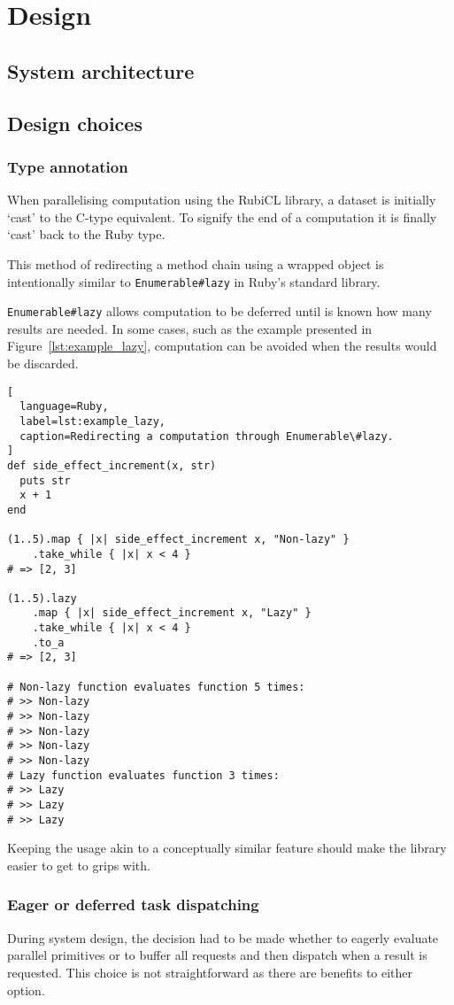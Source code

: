 \chapter{Design}

\section{System architecture}


\section{Design choices}
\subsection{Type annotation}
When parallelising computation using the RubiCL library, a dataset is initially `cast' to the C-type equivalent. To signify the end of a computation it is finally `cast' back to the Ruby type.

This method of redirecting a method chain using a wrapped object is intentionally similar to \verb|Enumerable#lazy| in Ruby's standard library.

\verb|Enumerable#lazy| allows computation to be deferred until is known how many results are needed. In some cases, such as the example presented in Figure~\ref{lst:example_lazy}, computation can be avoided when the results would be discarded.

\begin{lstlisting}[
  language=Ruby,
  label=lst:example_lazy,
  caption=Redirecting a computation through Enumerable\#lazy.
]
def side_effect_increment(x, str)
  puts str
  x + 1
end

(1..5).map { |x| side_effect_increment x, "Non-lazy" }
    .take_while { |x| x < 4 }
# => [2, 3]

(1..5).lazy
    .map { |x| side_effect_increment x, "Lazy" }
    .take_while { |x| x < 4 }
    .to_a
# => [2, 3]

# Non-lazy function evaluates function 5 times:
# >> Non-lazy
# >> Non-lazy
# >> Non-lazy
# >> Non-lazy
# >> Non-lazy
# Lazy function evaluates function 3 times:
# >> Lazy
# >> Lazy
# >> Lazy
\end{lstlisting}

Keeping the usage akin to a conceptually similar feature should make the library easier to get to grips with.

\subsection{Eager or deferred task dispatching}
During system design, the decision had to be made whether to eagerly evaluate parallel primitives or to buffer all requests and then dispatch when a result is requested. This choice is not straightforward as there are benefits to either option.

